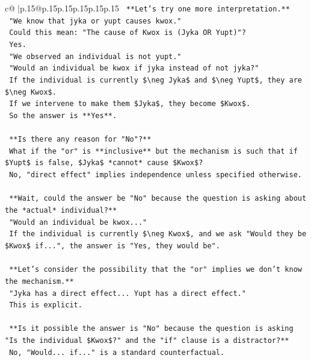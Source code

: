 \documentclass{article}
\begin{document}
{\begin{supertabular}{c@{$\;$}|p{.15\linewidth}@{}p{.15\linewidth}p{.15\linewidth}p{.15\linewidth}p{.15\linewidth}p{.15\linewidth}}
{{{\texttt{    **Let's try one more interpretation.**} \\
\texttt{    "We know that jyka or yupt causes kwox."} \\
\texttt{    Could this mean: "The cause of Kwox is (Jyka OR Yupt)"?} \\
\texttt{    Yes.} \\
\texttt{    "We observed an individual is not yupt."} \\
\texttt{    "Would an individual be kwox if jyka instead of not jyka?"} \\
\texttt{    If the individual is currently \$\textbackslash{}neg Jyka\$ and \$\textbackslash{}neg Yupt\$, they are \$\textbackslash{}neg Kwox\$.} \\
\texttt{    If we intervene to make them \$Jyka\$, they become \$Kwox\$.} \\
\texttt{    So the answer is **Yes**.} \\
\\ 
\texttt{    **Is there any reason for "No"?**} \\
\texttt{    What if the "or" is **inclusive** but the mechanism is such that if \$Yupt\$ is false, \$Jyka\$ *cannot* cause \$Kwox\$?} \\
\texttt{    No, "direct effect" implies independence unless specified otherwise.} \\
\\ 
\texttt{    **Wait, could the answer be "No" because the question is asking about the *actual* individual?**} \\
\texttt{    "Would an individual be kwox..."} \\
\texttt{    If the individual is currently \$\textbackslash{}neg Kwox\$, and we ask "Would they be \$Kwox\$ if...", the answer is "Yes, they would be".} \\
\\ 
\texttt{    **Let's consider the possibility that the "or" implies we don't know the mechanism.**} \\
\texttt{    "Jyka has a direct effect... Yupt has a direct effect."} \\
\texttt{    This is explicit.} \\
\\ 
\texttt{    **Is it possible the answer is "No" because the question is asking "Is the individual \$Kwox\$?" and the "if" clause is a distractor?**} \\
\texttt{    No, "Would... if..." is a standard counterfactual.} \\
\\ 
}}}
\end{supertabular}}
\end{document}
